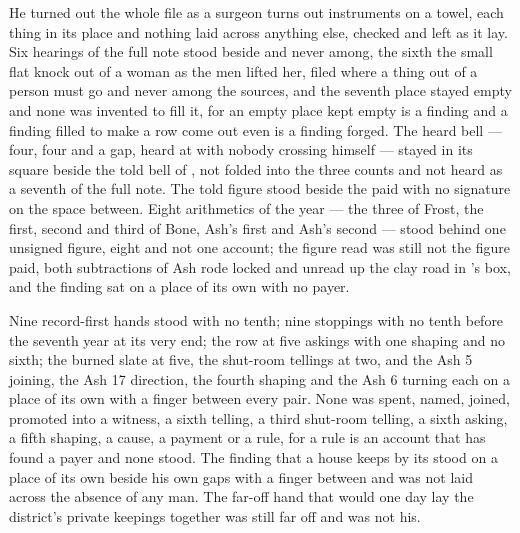 He turned out the whole file as a surgeon turns out instruments on a towel, each thing in its place and nothing laid across anything else, checked and left as it lay. Six hearings of the full note stood beside and never among, the sixth the small flat knock out of a woman as the men lifted her, filed where a thing out of a person must go and never among the sources, and the seventh place stayed empty and none was invented to fill it, for an empty place kept empty is a finding and a finding filled to make a row come out even is a finding forged. The heard bell --- four, four and a gap, heard at  with nobody crossing himself --- stayed in its square beside the told bell of , not folded into the three counts and not heard as a seventh of the full note. The told figure stood beside the paid with no signature on the space between. Eight arithmetics of the year --- the three of Frost, the first, second and third of Bone, Ash’s first and Ash’s second --- stood behind one unsigned figure, eight and not one account; the figure read was still not the figure paid, both subtractions of Ash rode locked and unread up the clay road in ’s box, and the finding sat on a place of its own with no payer.

Nine record-first hands stood with no tenth; nine stoppings with no tenth before the seventh year at its very end; the row at five askings with one shaping and no sixth; the burned slate at five, the shut-room tellings at two, and the Ash 5 joining, the Ash 17 direction, the fourth shaping and the Ash 6 turning each on a place of its own with a finger between every pair. None was spent, named, joined, promoted into a witness, a sixth telling, a third shut-room telling, a sixth asking, a fifth shaping, a cause, a payment or a rule, for a rule is an account that has found a payer and none stood. The finding that a house keeps by its  stood on a place of its own beside his own gaps with a finger between and was not laid across the absence of any man. The far-off hand that would one day lay the district’s private keepings together was still far off and was not his.


